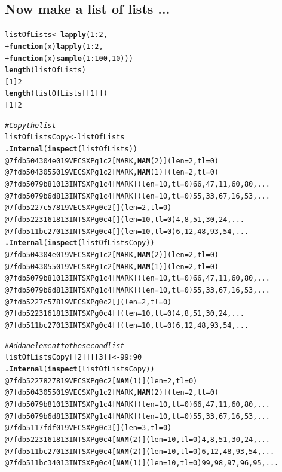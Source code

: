 \documentclass{article}\usepackage[]{graphicx}\usepackage[]{color}
\makeatletter
\newcommand{\hlcom}[1]{\textcolor[rgb]{0.678,0.584,0.686}{\textit{#1}}}%
\newcommand{\hlkwd}[1]{\textcolor[rgb]{0.737,0.353,0.396}{\textbf{#1}}}%
\newenvironment{kframe}{%
 \def\at@end@of@kframe{}%
 \ifinner\ifhmode%
  \def\at@end@of@kframe{\end{minipage}}%
  \begin{minipage}{\columnwidth}%
 \fi\fi%
 \def\FrameCommand##1{\hskip\@totalleftmargin \hskip-\fboxsep
 \colorbox{shadecolor}{##1}\hskip-\fboxsep
     \hskip-\linewidth \hskip-\@totalleftmargin \hskip\columnwidth}%
 \MakeFramed {\advance\hsize-\width
   \@totalleftmargin\z@ \linewidth\hsize
   \@setminipage}}%
 {\par\unskip\endMakeFramed%
 \at@end@of@kframe}
\newenvironment{knitrout}{}{} %
\makeatother
\begin{document}
\subsection{Now make a list of lists ...} %

\begin{knitrout}
\color{fgcolor}\begin{kframe}
\begin{alltt}
listOfLists <-\hlkwd{lapply}(1:2, 
+                      \hlkwd{function}(x) \hlkwd{lapply}(1:2,
+                                         \hlkwd{function}(x) \hlkwd{sample}(1:100,10)))
\hlkwd{length}(listOfLists)
[1] 2
\hlkwd{length}(listOfLists[[1]])
[1] 2

\hlcom{#Copy the list}
listOfListsCopy <- listOfLists
\hlkwd{.Internal}(\hlkwd{inspect}(listOfLists))
@7fdb504304e0 19 VECSXP g1c2 [MARK,\hlkwd{NAM}(2)] (len=2, tl=0)
  @7fdb50430550 19 VECSXP g1c2 [MARK,\hlkwd{NAM}(1)] (len=2, tl=0)
    @7fdb5079b810 13 INTSXP g1c4 [MARK] (len=10, tl=0) 66,47,11,60,80,...
    @7fdb5079b6d8 13 INTSXP g1c4 [MARK] (len=10, tl=0) 55,33,67,16,53,...
  @7fdb5227c578 19 VECSXP g0c2 [] (len=2, tl=0)
    @7fdb52231618 13 INTSXP g0c4 [] (len=10, tl=0) 4,8,51,30,24,...
    @7fdb511bc270 13 INTSXP g0c4 [] (len=10, tl=0) 6,12,48,93,54,...
\hlkwd{.Internal}(\hlkwd{inspect}(listOfListsCopy))
@7fdb504304e0 19 VECSXP g1c2 [MARK,\hlkwd{NAM}(2)] (len=2, tl=0)
  @7fdb50430550 19 VECSXP g1c2 [MARK,\hlkwd{NAM}(1)] (len=2, tl=0)
    @7fdb5079b810 13 INTSXP g1c4 [MARK] (len=10, tl=0) 66,47,11,60,80,...
    @7fdb5079b6d8 13 INTSXP g1c4 [MARK] (len=10, tl=0) 55,33,67,16,53,...
  @7fdb5227c578 19 VECSXP g0c2 [] (len=2, tl=0)
    @7fdb52231618 13 INTSXP g0c4 [] (len=10, tl=0) 4,8,51,30,24,...
    @7fdb511bc270 13 INTSXP g0c4 [] (len=10, tl=0) 6,12,48,93,54,...

\hlcom{#Add an element to the second list}
listOfListsCopy[[2]][[3]] <- 99:90
\hlkwd{.Internal}(\hlkwd{inspect}(listOfListsCopy))
@7fdb52278278 19 VECSXP g0c2 [\hlkwd{NAM}(1)] (len=2, tl=0)
  @7fdb50430550 19 VECSXP g1c2 [MARK,\hlkwd{NAM}(2)] (len=2, tl=0)
    @7fdb5079b810 13 INTSXP g1c4 [MARK] (len=10, tl=0) 66,47,11,60,80,...
    @7fdb5079b6d8 13 INTSXP g1c4 [MARK] (len=10, tl=0) 55,33,67,16,53,...
  @7fdb5117fdf0 19 VECSXP g0c3 [] (len=3, tl=0)
    @7fdb52231618 13 INTSXP g0c4 [\hlkwd{NAM}(2)] (len=10, tl=0) 4,8,51,30,24,...
    @7fdb511bc270 13 INTSXP g0c4 [\hlkwd{NAM}(2)] (len=10, tl=0) 6,12,48,93,54,...
    @7fdb511bc340 13 INTSXP g0c4 [\hlkwd{NAM}(1)] (len=10, tl=0) 99,98,97,96,95,...
\end{alltt}
\end{kframe}
\end{knitrout}
\end{document}
